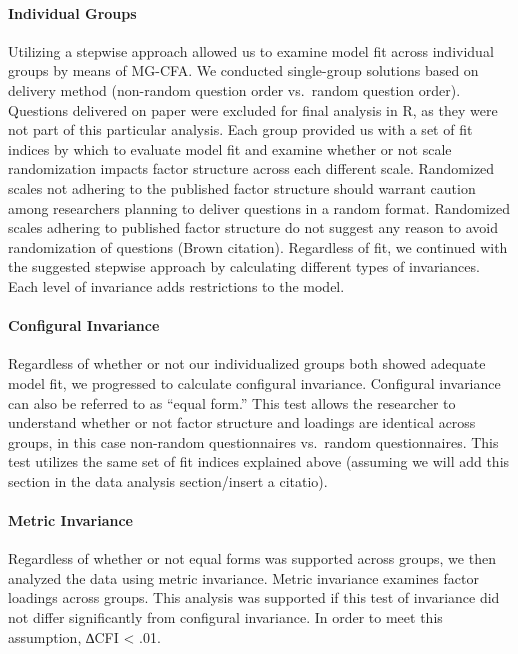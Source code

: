 \documentclass[english,man]{apa6}
\begin{document}
\paragraph{Individual Groups}\label{individual-groups}

Utilizing a stepwise approach allowed us to examine model fit across
individual groups by means of MG-CFA. We conducted single-group
solutions based on delivery method (non-random question order vs.~random
question order). Questions delivered on paper were excluded for final
analysis in R, as they were not part of this particular analysis. Each
group provided us with a set of fit indices by which to evaluate model
fit and examine whether or not scale randomization impacts factor
structure across each different scale. Randomized scales not adhering to
the published factor structure should warrant caution among researchers
planning to deliver questions in a random format. Randomized scales
adhering to published factor structure do not suggest any reason to
avoid randomization of questions (Brown citation). Regardless of fit, we
continued with the suggested stepwise approach by calculating different
types of invariances. Each level of invariance adds restrictions to the
model.

\paragraph{Configural Invariance}\label{configural-invariance}

Regardless of whether or not our individualized groups both showed
adequate model fit, we progressed to calculate configural invariance.
Configural invariance can also be referred to as \enquote{equal form.}
This test allows the researcher to understand whether or not factor
structure and loadings are identical across groups, in this case
non-random questionnaires vs.~random questionnaires. This test utilizes
the same set of fit indices explained above (assuming we will add this
section in the data analysis section/insert a citatio).

\paragraph{Metric Invariance}\label{metric-invariance}

Regardless of whether or not equal forms was supported across groups, we
then analyzed the data using metric invariance. Metric invariance
examines factor loadings across groups. This analysis was supported if
this test of invariance did not differ significantly from configural
invariance. In order to meet this assumption, ∆CFI \textless{} .01.
\end{document}
